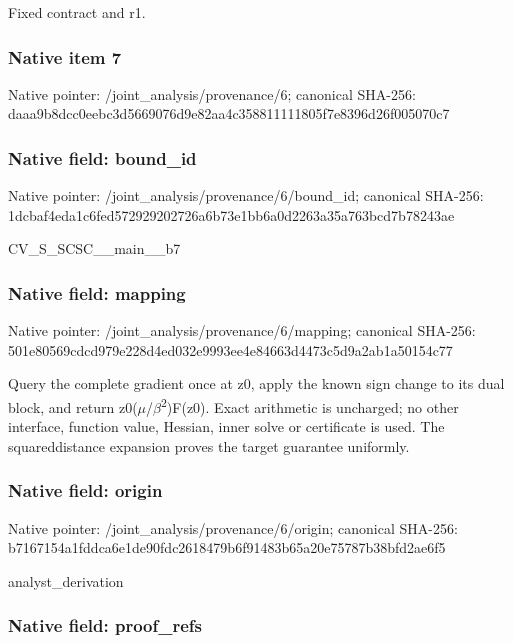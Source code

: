 \documentclass[10pt,a4paper]{article}
\begin{document}
Fixed contract and r1.


\subsubsection{Native item 7}


Native pointer: /joint\_analysis/provenance/6; canonical SHA-256: daaa9b8dcc0eebc3d5669076\allowbreak{}d9e82aa4c358811111805f7e\allowbreak{}8396d26f005070c7



\subsubsection{Native field: bound\_id}


Native pointer: /joint\_analysis/provenance/6/bound\_id; canonical SHA-256: 1dcbaf4eda1c6fed57292920\allowbreak{}2726a6b73e1bb6a0d2263a35\allowbreak{}a763bcd7b78243ae


CV\_S\_SCSC\_\_main\_\_b7


\subsubsection{Native field: mapping}


Native pointer: /joint\_analysis/provenance/6/mapping; canonical SHA-256: 501e80569cdcd979e228d4ed\allowbreak{}032e9993ee4e84663d4473c5\allowbreak{}d9a2ab1a50154c77


Query the complete gradient once at z0, apply the known sign change to its dual block, and return z0(\ensuremath{\mu}/\ensuremath{\beta}\textsuperscript{2})F(z0). Exact arithmetic is uncharged; no other interface, function value, Hessian, inner solve or certificate is used. The squareddistance expansion proves the target guarantee uniformly.


\subsubsection{Native field: origin}


Native pointer: /joint\_analysis/provenance/6/origin; canonical SHA-256: b7167154a1fddca6e1de90fd\allowbreak{}c2618479b6f91483b65a20e7\allowbreak{}5787b38bfd2ae6f5


analyst\_derivation


\subsubsection{Native field: proof\_refs}
\end{document}
